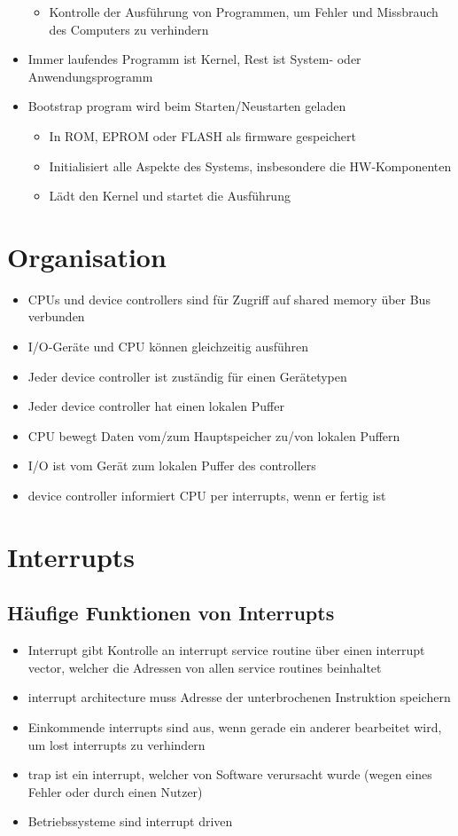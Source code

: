 \documentclass[a4paper]{scrreprt}
\begin{document}
\begin{itemize}
		\begin{itemize}
			\item Kontrolle der Ausführung von Programmen, um Fehler und Missbrauch des Computers zu verhindern
		\end{itemize}
	\item Immer laufendes Programm ist Kernel, Rest ist System- oder Anwendungsprogramm
	\item Bootstrap program wird beim Starten/Neustarten geladen
		\begin{itemize}
			\item In ROM, EPROM oder FLASH als firmware gespeichert
			\item Initialisiert alle Aspekte des Systems, insbesondere die HW-Komponenten
			\item Lädt den Kernel und startet die Ausführung
		\end{itemize}
\end{itemize}

\section{Organisation}
\begin{itemize}
	\item CPUs und device controllers sind für Zugriff auf shared memory über Bus verbunden
	\item I/O-Geräte und CPU können gleichzeitig ausführen
	\item Jeder device controller ist zuständig für einen Gerätetypen
	\item Jeder device controller hat einen lokalen Puffer
	\item CPU bewegt Daten vom/zum Hauptspeicher zu/von lokalen Puffern
	\item I/O ist vom Gerät zum lokalen Puffer des controllers
	\item device controller informiert CPU per interrupts, wenn er fertig ist
\end{itemize}


\section{Interrupts}
\subsection{Häufige Funktionen von Interrupts}
\begin{itemize}
	\item Interrupt gibt Kontrolle an interrupt service routine über einen interrupt vector, welcher die Adressen von allen service routines beinhaltet
	\item interrupt architecture muss Adresse der unterbrochenen Instruktion speichern
	\item Einkommende interrupts sind aus, wenn gerade ein anderer bearbeitet wird, um lost interrupts zu verhindern
	\item trap ist ein interrupt, welcher von Software verursacht wurde (wegen eines Fehler oder durch einen Nutzer)
	\item Betriebssysteme sind interrupt driven
\end{itemize}
\end{document}
